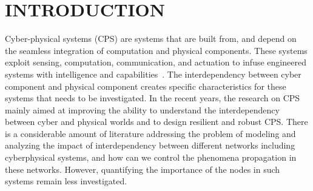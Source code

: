 \documentclass[letterpaper, 10 pt, conference]{ieeeconf}  %
\begin{document}
\section{INTRODUCTION}
Cyber-physical systems (CPS) are systems that are built from, and depend on the seamless integration of computation and physical components. These systems exploit sensing, computation, communication, and actuation to infuse engineered systems with intelligence and capabilities~\cite{c1}. The interdependency between cyber component and physical component creates specific characteristics for these systems that needs to be investigated.
In the recent years, the research on CPS mainly aimed at improving the ability to understand the interdependency between cyber and physical worlds and to design resilient and robust CPS.
There is a considerable amount of literature addressing the problem of modeling and analyzing the impact of interdependency between different networks including cyberphysical systems, and how can we control the phenomena propagation in these networks. However, quantifying the importance of the nodes in such systems remain less investigated.
\end{document}
